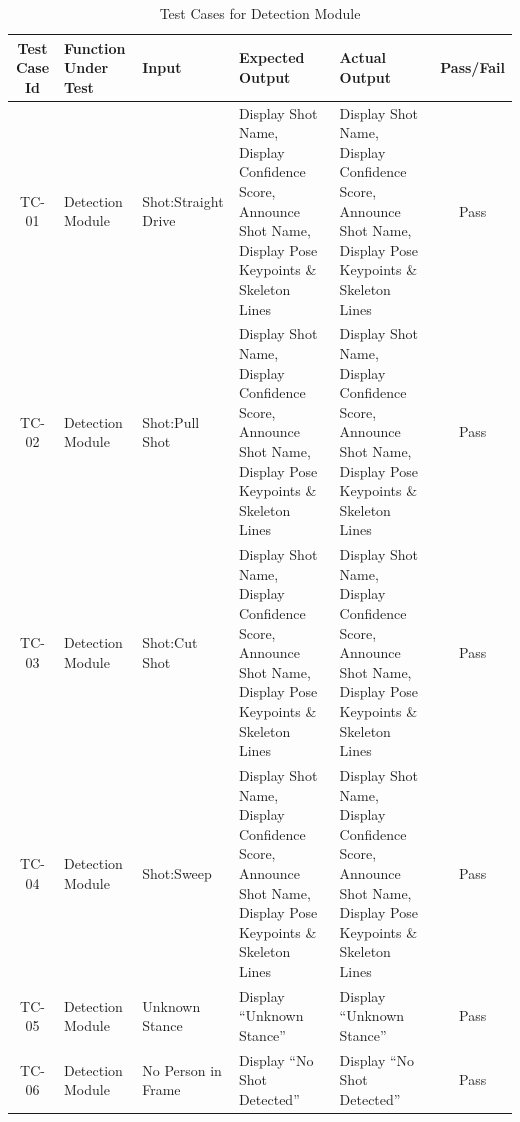 \begin{table}[H]
	\caption{Test Cases for Detection Module}
	\renewcommand{\arraystretch}{1.2}
	\setlength{\tabcolsep}{1.0pt}
	\begin{tabular}{|c|p{2.0cm}|p{2.5cm}|p{3.5cm}|p{3.5cm}|c|}
		\hline
		\rowcolor[gray]{0.85}
		\textbf{Test Case Id} & \textbf{Function Under Test} & \textbf{Input} & 
		\textbf{Expected Output} & \textbf{Actual Output} & \textbf{Pass/Fail} \\
		\hline
		
		TC-01 & Detection Module & Shot:Straight Drive &
		Display Shot Name, Display Confidence Score, Announce Shot Name, Display Pose Keypoints \& Skeleton Lines &
		Display Shot Name, Display Confidence Score, Announce Shot Name, Display Pose Keypoints \& Skeleton Lines &
		\textcolor{green!60!black}{Pass} \\
		\hline
		
		TC-02 & Detection Module & Shot:Pull Shot &
		Display Shot Name, Display Confidence Score, Announce Shot Name, Display Pose Keypoints \& Skeleton Lines &
		Display Shot Name, Display Confidence Score, Announce Shot Name, Display Pose Keypoints \& Skeleton Lines &
		\textcolor{green!60!black}{Pass} \\
		\hline
		
		TC-03 & Detection Module & Shot:Cut Shot &
		Display Shot Name, Display Confidence Score, Announce Shot Name, Display Pose Keypoints \& Skeleton Lines &
		Display Shot Name, Display Confidence Score, Announce Shot Name, Display Pose Keypoints \& Skeleton Lines &
		\textcolor{green!60!black}{Pass} \\
		\hline
		
		TC-04 & Detection Module & Shot:Sweep &
		Display Shot Name, Display Confidence Score, Announce Shot Name, Display Pose Keypoints \& Skeleton Lines &
		Display Shot Name, Display Confidence Score, Announce Shot Name, Display Pose Keypoints \& Skeleton Lines &
		\textcolor{green!60!black}{Pass} \\
		\hline
		
		TC-05 & Detection Module & Unknown Stance &
		Display ``Unknown Stance'' &
		Display ``Unknown Stance'' &
		\textcolor{green!60!black}{Pass} \\
		\hline
		
		TC-06 & Detection Module & No Person in Frame &
		Display ``No Shot Detected'' &
		Display ``No Shot Detected'' &
		\textcolor{green!60!black}{Pass} \\
		\hline
		
	\end{tabular}
\end{table}
